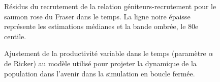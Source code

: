 \documentclass[french,11pt]{book}
\begin{document}
\begin{figure}[htb]

{\centering {} 

}

\caption{Résidus du recrutement de la relation géniteurs-recrutement pour le saumon rose du Fraser dans le temps. La ligne noire épaisse représente les estimations médianes et la bande ombrée, le 80e centile.}\label{fig:fig-rec-resid}
\end{figure}

\begin{figure}[htb]

{\centering {} 

}

\caption{Ajustement de la productivité variable dans le temps (paramètre \(\alpha\) de Ricker) au modèle utilisé pour projeter la dynamique de la population dans l'avenir dans la simulation en boucle fermée.}\label{fig:fig-tv-alpha}
\end{figure}
\end{document}
